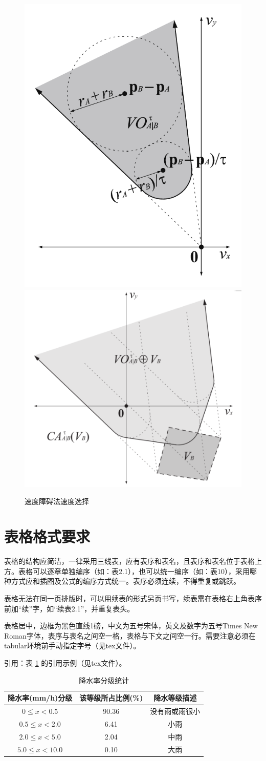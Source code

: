 \documentclass{seuthesis-2022}
\begin{document}
\begin{figure}[H]
    \centering
      {\includegraphics[width=0.3\linewidth]{fig/速度障碍集合.png}}
      {\includegraphics[width=0.4\linewidth]{fig/避免碰撞集合.png}}
    \caption{速度障碍法速度选择}
    \label{fig:2}
\end{figure}

\section{表格格式要求}
表格的结构应简洁，一律采用三线表，应有表序和表名，且表序和表名位于表格上方。表格可以逐章单独编序（如：表2.1），也可以统一编序（如：表10），采用哪种方式应和插图及公式的编序方式统一。表序必须连续，不得重复或跳跃。

表格无法在同一页排版时，可以用续表的形式另页书写，续表需在表格右上角表序前加“续”字，如“续表2.1”，并重复表头。

表格居中，边框为黑色直线1磅，中文为五号宋体，英文及数字为五号Times New Roman字体，表序与表名之间空一格，表格与下文之间空一行。需要注意必须在tabular环境前手动指定字号（见tex文件）。

引用：表 \ref{tab:1} 的引用示例（见tex文件）。

\begin{table}[H]
  \centering
  \caption{降水率分级统计}
  \label{tab:1}
  \small
  \begin{tabular}{ccc}
    \toprule
    降水率(mm/h)分级 & 该等级所占比例(\%) & 降水等级描述\\
    \midrule
    $0\le x< 0.5$ & 90.36 & 没有雨或雨很小\\
    $0.5\le x< 2.0$ & 6.41 & 小雨\\
    $2.0\le x< 5.0$ & 2.04 & 中雨\\
    $5.0\le x< 10.0$ & 0.10 & 大雨\\
    \bottomrule
  \end{tabular}
\end{table}
\end{document}
